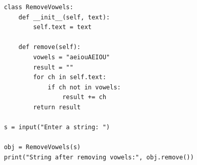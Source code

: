 \begin{verbatim}
    class RemoveVowels:
        def __init__(self, text):
            self.text = text
    
        def remove(self):
            vowels = "aeiouAEIOU"
            result = ""
            for ch in self.text:
                if ch not in vowels:
                    result += ch
            return result
    
    s = input("Enter a string: ")
    
    obj = RemoveVowels(s)
    print("String after removing vowels:", obj.remove())
\end{verbatim}